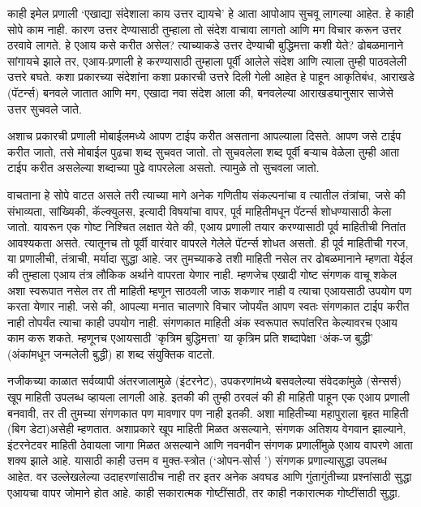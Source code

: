 काही इमेल प्रणाली  `एखाद्या संदेशाला काय उत्तर द्यायचे' हे आता आपोआप सुचवू लागल्या आहेत. हे काही सोपे काम नाही. कारण उत्तर देण्यासाठी तुम्हाला तो संदेश वाचावा लागतो आणि मग विचार करून उत्तर ठरवावे लागते. हे एआय कसे करीत असेल? त्याच्याकडे उत्तर देण्याची बुद्धिमत्ता कशी येते? ढोबळमानाने सांगायचे झाले तर, एआय-प्रणाली हे करण्यासाठी तुम्हाला पूर्वी आलेले संदेश आणि त्याला तुम्ही पाठवलेली उत्तरे बघते. कशा प्रकारच्या संदेशांना कशा प्रकारची उत्तरे दिली गेली आहेत हे पाहून आकृतिबंध, आराखडे (पॅटर्न्स) बनवले जातात आणि मग, एखादा नवा संदेश आला की, बनवलेल्या आराखड्यानुसार साजेसे उत्तर सुचवले जाते.

अशाच प्रकारची प्रणाली मोबाईलमध्ये आपण टाईप करीत असताना आपल्याला दिसते. आपण जसे टाईप करीत जातो, तसे मोबाईल  पुढचा शब्द सुचवत जातो. तो सुचवलेला शब्द पूर्वी बऱ्याच वेळेला तुम्ही आता टाईप करीत असलेल्या शब्दाच्या पुढे वापरलेला असतो. त्यामुळे तो सुचवला जातो.

वाचताना हे सोपे वाटत असले तरी त्याच्या मागे अनेक गणितीय संकल्पनांचा व त्यातील तंत्रांचा, जसे की  संभाव्यता, सांख्यिकी, कॅल्क्युलस, इत्यादी विषयांचा वापर,  पूर्व माहितीमधून पॅटर्न्स  शोधण्यासाठी केला जातो. यावरून एक गोष्ट निश्चित लक्षात येते की, एआय प्रणाली तयार करण्यासाठी पूर्व माहितीची नितांत आवश्यकता असते. त्यातूनच तो पूर्वी वारंवार वापरले गेलेले पॅटर्न्स  शोधत असतो. ही पूर्व माहितीची गरज, या प्रणालीची, तंत्राची, मर्यादा सुद्धा आहे. जर तुमच्याकडे तशी माहिती नसेल तर ढोबळमानाने म्हणता येईल की तुम्हाला एआय तंत्र लौकिक अर्थाने वापरता येणार नाही. म्हणजेच एखादी गोष्ट संगणक वाचू शकेल अशा स्वरूपात नसेल तर ती माहिती म्हणून साठवली जाऊ शकणार नाही व त्याचा एआयसाठी उपयोग पण करता येणार नाही. जसे की, आपल्या मनात चालणारे विचार जोपर्यंत आपण स्वतः संगणकात टाईप करीत नाही तोपर्यंत त्याचा काही उपयोग नाही. संगणकात माहिती अंक स्वरूपात रूपांतरित केल्यावरच एआय काम करू शकते. म्हणूनच एआयसाठी 'कृत्रिम बुद्धिमत्ता' या कृत्रिम प्रति शब्दापेक्षा `अंक-ज बुद्धी' (अंकांमधून जन्मलेली बुद्धी) हा शब्द संयुक्तिक वाटतो.

नजीकच्या काळात सर्वव्यापी अंतरजालामुळे (इंटरनेट), उपकरणांमध्ये बसवलेल्या संवेदकांमुळे (सेन्सर्स)  खूप माहिती उपलब्ध व्हायला लागली आहे. इतकी  की तुम्ही ठरवलं की ही माहिती पाहून एक एआय प्रणाली बनवावी, तर ती  तुमच्या संगणकात पण मावणार पण नाही इतकी. अशा माहितीच्या महापुराला बृहत माहिती (बिग डेटा)असेही म्हणतात. अशाप्रकारे खूप माहिती मिळत असल्याने, संगणक अतिशय वेगवान झाल्याने, इंटरनेटवर माहिती ठेवायला जागा मिळत असल्याने आणि नवनवीन संगणक प्रणालींमुळे एआय वापरणे आता शक्य झाले आहे. यासाठी काही उत्तम व मुक्त-स्त्रोत (`ओपन-सोर्स ') संगणक प्रणाल्यासुद्धा उपलब्ध आहेत. वर उल्लेखलेल्या उदाहरणांसाठीच नाही तर इतर अनेक अवघड आणि गुंतागुंतीच्या प्रश्नांसाठी सुद्धा एआयचा वापर जोमाने होत आहे. काही सकारात्मक गोष्टींसाठी, तर काही नकारात्मक गोष्टींसाठी सुद्धा.

